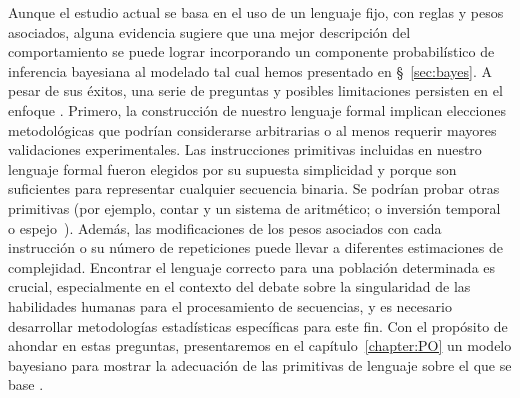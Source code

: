 
Aunque el estudio actual se basa en el uso de un lenguaje fijo, con reglas y pesos asociados, alguna evidencia sugiere que una mejor descripción del comportamiento se puede lograr incorporando un componente probabilístico de inferencia bayesiana al modelado tal cual hemos presentado en \S~\ref{sec:bayes}. A pesar de sus éxitos, una serie de preguntas y posibles limitaciones persisten en el enfoque \lot. Primero, la construcción de nuestro lenguaje formal implican elecciones metodológicas que podrían considerarse arbitrarias o al menos requerir mayores validaciones experimentales. Las instrucciones primitivas incluidas en nuestro lenguaje formal fueron elegidos por su supuesta simplicidad y porque son suficientes para representar cualquier secuencia binaria. Se podrían probar otras primitivas (por ejemplo, contar y un sistema de aritmético; o inversión temporal o espejo~\cite{f10}). Además, las modificaciones de los pesos asociados con cada instrucción o su número de repeticiones puede llevar a diferentes estimaciones de complejidad. Encontrar el lenguaje correcto para una población determinada es crucial, especialmente en el contexto del debate sobre la singularidad de las habilidades humanas para el procesamiento de secuencias, y es necesario desarrollar metodologías estadísticas específicas para este fin. Con el propósito de ahondar en estas preguntas, presentaremos en el capítulo~\ref{chapter:PO} un modelo bayesiano para mostrar la adecuación de las primitivas de lenguaje \gramgeo sobre el que se base \grambin. 

